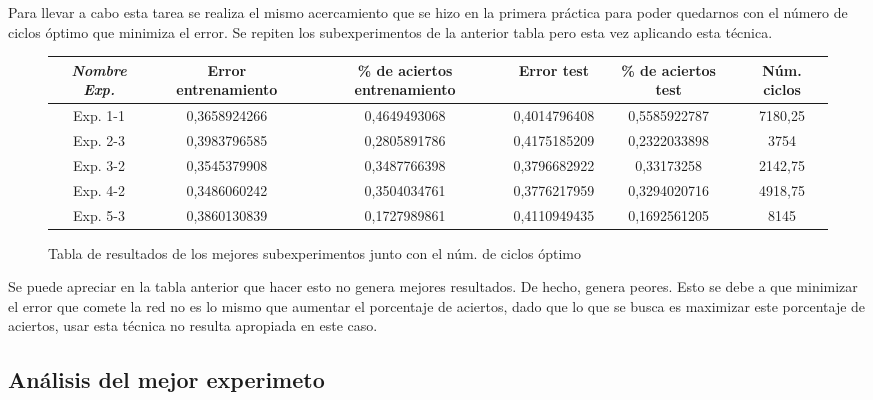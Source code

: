 \documentclass{uc3mpracticas}
\begin{document}
Para llevar a cabo esta tarea se realiza el mismo acercamiento que se hizo en la primera práctica para poder quedarnos con el número de ciclos óptimo que minimiza el error. Se repiten los subexperimentos de la anterior tabla pero esta vez aplicando esta técnica.


\begin{figure}[!h]
\begin{center}
  \begin{adjustwidth}{-1.4cm}{}
    \begin{tabular}{|c|c|c|c|c|c|}
      \hline
      \rowcolor{LightCyan}
          \textit{\textbf{Nombre Exp.}}     & \textbf{Error entrenamiento} & \textbf{\% de aciertos entrenamiento} & \textbf{Error test} & \textbf{\% de aciertos test} & \textbf{Núm. ciclos} \\ \hline
          Exp. 1-1         &  0,3658924266       &  0,4649493068                &  0,4014796408   &  0,5585922787   &  7180,25  \\ \hline
          Exp. 2-3         &  0,3983796585       &  0,2805891786                &  0,4175185209   &  0,2322033898   &  3754     \\ \hline
          Exp. 3-2         &  0,3545379908       &  0,3487766398                &  0,3796682922   &  0,33173258     &  2142,75  \\ \hline
          Exp. 4-2         &  0,3486060242       &  0,3504034761                &  0,3776217959   &  0,3294020716   &  4918,75  \\ \hline
          Exp. 5-3         &  0,3860130839       &  0,1727989861                &  0,4110949435   &  0,1692561205   &  8145     \\ \hline
    \end{tabular}
  \end{adjustwidth}
\end{center}
\caption*{Tabla de resultados de los mejores subexperimentos junto con el núm. de ciclos óptimo}
\end{figure}

Se puede apreciar en la tabla anterior que hacer esto no genera mejores resultados. De hecho, genera peores. Esto se debe a que minimizar el error que comete la red no es lo mismo que aumentar el porcentaje de aciertos, dado que lo que se busca es maximizar este porcentaje de aciertos, usar esta técnica no resulta apropiada en este caso.



\subsection{Análisis del mejor experimeto}
\end{document}
